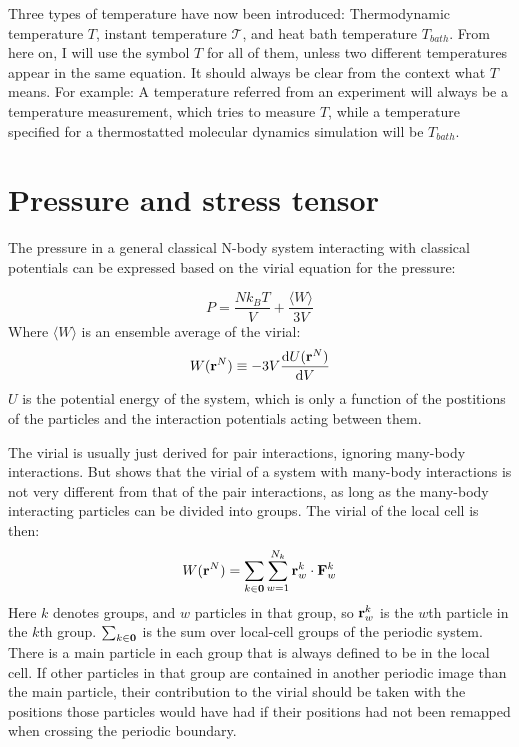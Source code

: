 Three types of temperature have now been introduced: Thermodynamic temperature $T$, instant temperature $\mathcal{T}$, and heat bath temperature $T_{bath}$. From here on, I will use the symbol $T$ for all of them, unless two different temperatures appear in the same equation. It should always be clear from the context what $T$ means. For example: A temperature referred from an experiment will always be a temperature measurement, which tries to measure $T$, while a temperature specified for a thermostatted molecular dynamics simulation will be $T_{bath}$.

\section{Pressure and stress tensor}
The pressure in a general classical N-body system interacting with classical potentials can be expressed based on the virial equation for the pressure:

\begin{equation}
	P = \frac{Nk_BT}{V} + \frac{\langle W \rangle}{3V}
\end{equation}
Where $\langle W \rangle$ is an ensemble average of the virial:
\begin{equation}
	W(\mathbf{r}^N) \equiv -3V\frac{\mathrm{d} U(\mathbf{r}^N)}{\mathrm{d} V}
\end{equation}
$U$ is the potential energy of the system, which is only a function of the postitions of the particles and the interaction potentials acting between them. 

The virial is usually just derived for pair interactions, ignoring many-body interactions. But \citet{Thompson2009} shows that the virial of a system with many-body interactions is not very different from that of the pair interactions, as long as the many-body interacting particles can be divided into groups. The virial of the local cell is then:
\begin{equation}
	W(\mathbf{r}^N) = \sum_{k\in\mathbf{0}}\sum_{w=1}^{N_k} \mathbf{r}^k_w \cdot \mathbf{F}^k_w
\end{equation}
Here $k$ denotes groups, and $w$ particles in that group, so $\mathbf{r}^k_w$ is the $w$th particle in the $k$th group. $\sum_{k \in \mathbf{0}}$ is the sum over local-cell groups of the periodic system. There is a main particle in each group that is always defined to be in the local cell. If other particles in that group are contained in another periodic image than the main particle, their contribution to the virial should be taken with the positions those particles would have had if their positions had not been remapped when crossing the periodic boundary.

